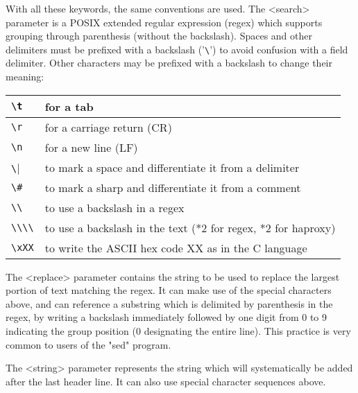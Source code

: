 With all these keywords, the same conventions are used. The <search> parameter
is a POSIX extended regular expression (regex) which supports grouping through
parenthesis (without the backslash). Spaces and other delimiters must be
prefixed with a backslash ('\verb|\|') to avoid confusion with a field delimiter.
Other characters may be prefixed with a backslash to change their meaning:

\begin{tabular}{|l|l|}
\hline
\verb|\t|   & for a tab \\
\hline
\verb|\r|   & for a carriage return (CR) \\
\hline
\verb|\n|   & for a new line (LF) \\
\hline
\verb|\|    & to mark a space and differentiate it from a delimiter \\
\hline
\verb|\#|   & to mark a sharp and differentiate it from a comment \\
\hline
\verb|\\|   & to use a backslash in a regex \\
\hline
\verb|\\\\| & to use a backslash in the text (*2 for regex, *2 for haproxy) \\
\hline
\verb|\xXX| & to write the ASCII hex code XX as in the C language \\
\hline
\end{tabular}

The <replace> parameter contains the string to be used to replace the largest
portion of text matching the regex. It can make use of the special characters
above, and can reference a substring which is delimited by parenthesis in the
regex, by writing a backslash \chr{\bslash} immediately followed by one digit from 0 to
9 indicating the group position (0 designating the entire line). This practice
is very common to users of the "sed" program.

The <string> parameter represents the string which will systematically be added
after the last header line. It can also use special character sequences above.

